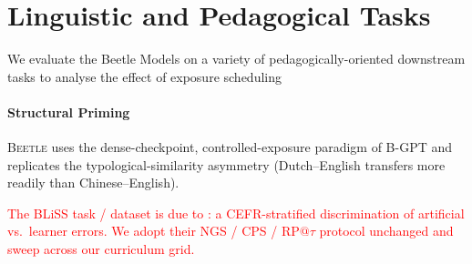 \documentclass[11pt]{article}
\begin{document}
\section{Linguistic and Pedagogical Tasks}

We evaluate the Beetle Models on a variety of pedagogically-oriented downstream tasks to analyse the effect of exposure scheduling 

\paragraph{Structural Priming} \textsc{Beetle} uses the dense-checkpoint, controlled-exposure paradigm of B-GPT \citep{arnett-etal-2025-acquisition} and replicates the typological-similarity asymmetry (Dutch--English transfers more readily than Chinese--English).

\textcolor{red}{The BLiSS task / dataset is due to \citet{gao2025bliss}: a CEFR-stratified discrimination of artificial vs.\ learner errors. We adopt their NGS / CPS / RP$@\tau$ protocol unchanged and sweep across our curriculum grid.}
\end{document}
